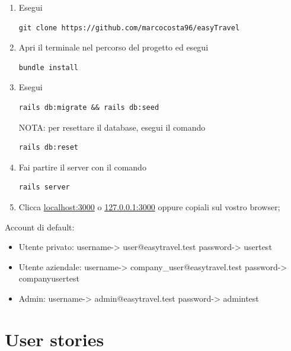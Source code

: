 \documentclass[11pt]{article}
\begin{document}
\begin{enumerate}
	\item Esegui \begin{verbatim}git clone https://github.com/marcocosta96/easyTravel\end{verbatim}
	\item Apri il terminale nel percorso del progetto ed esegui \begin{verbatim}bundle install\end{verbatim}
	\item Esegui \begin{verbatim}rails db:migrate && rails db:seed\end{verbatim} NOTA: per resettare il database, esegui il comando \begin{verbatim}rails db:reset\end{verbatim}
	\item Fai partire il server con il comando \begin{verbatim}rails server\end{verbatim}
	\item Clicca \href{localhost:3000}{localhost:3000} o \href{127.0.0.1:3000}{127.0.0.1:3000} oppure copiali sul vostro browser;
\end{enumerate}

Account di default:
\begin{itemize}
	\item Utente privato: username-> user@easytravel.test password-> usertest
	\item Utente aziendale: username-> company\_user@easytravel.test password-> companyusertest
	\item Admin: username-> admin@easytravel.test password-> admintest
\end{itemize}


\section{User stories}
\end{document}
